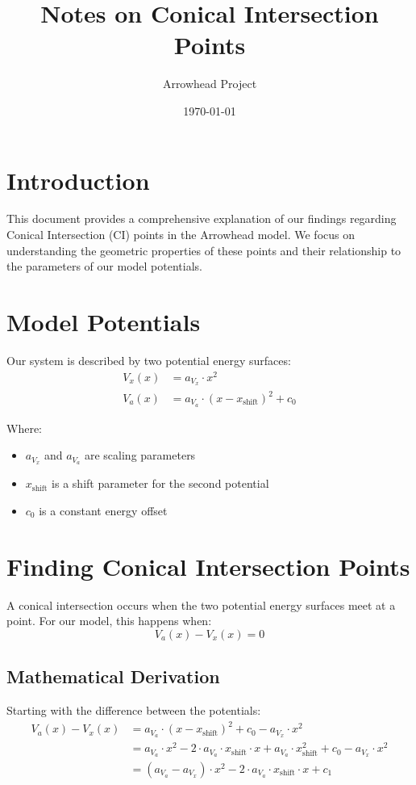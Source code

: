 \documentclass{article}
\title{Notes on Conical Intersection Points}
\author{Arrowhead Project}
\date{\today}
\begin{document}
\maketitle

\section{Introduction}

This document provides a comprehensive explanation of our findings regarding Conical Intersection (CI) points in the Arrowhead model. We focus on understanding the geometric properties of these points and their relationship to the parameters of our model potentials.

\section{Model Potentials}

Our system is described by two potential energy surfaces:
\begin{align}
V_x(x) &= a_{V_x} \cdot x^2 \\
V_a(x) &= a_{V_a} \cdot (x - x_{\text{shift}})^2 + c_0
\end{align}

Where:
\begin{itemize}
    \item $a_{V_x}$ and $a_{V_a}$ are scaling parameters
    \item $x_{\text{shift}}$ is a shift parameter for the second potential
    \item $c_0$ is a constant energy offset
\end{itemize}

\section{Finding Conical Intersection Points}

A conical intersection occurs when the two potential energy surfaces meet at a point. For our model, this happens when:
\begin{equation}
V_a(x) - V_x(x) = 0
\end{equation}

\subsection{Mathematical Derivation}

Starting with the difference between the potentials:
\begin{align}
V_a(x) - V_x(x) &= a_{V_a} \cdot (x - x_{\text{shift}})^2 + c_0 - a_{V_x} \cdot x^2 \\
&= a_{V_a} \cdot x^2 - 2 \cdot a_{V_a} \cdot x_{\text{shift}} \cdot x + a_{V_a} \cdot x_{\text{shift}}^2 + c_0 - a_{V_x} \cdot x^2 \\
&= (a_{V_a} - a_{V_x}) \cdot x^2 - 2 \cdot a_{V_a} \cdot x_{\text{shift}} \cdot x + c_1
\end{align}
\end{document}
